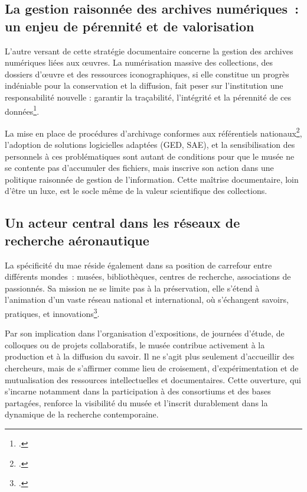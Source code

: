 \subsection{La gestion raisonnée des archives numériques : un enjeu de pérennité et de valorisation}

L’autre versant de cette stratégie documentaire concerne la gestion des archives numériques liées aux œuvres. La numérisation massive des collections, des dossiers d’œuvre et des ressources iconographiques, si elle constitue un progrès indéniable pour la conservation et la diffusion, fait peser sur l’institution une responsabilité nouvelle : garantir la traçabilité, l’intégrité et la pérennité de ces données\footcite{ministeredelacultureDocumenterArchiverMusee2020,bechardArchivesElectroniques2020a}. 

La mise en place de procédures d’archivage conformes aux référentiels nationaux\footcite{comiteinterministerielauxarchivesdefranceReferentielGeneralGestion}, l’adoption de solutions logicielles adaptées (GED, SAE), et la sensibilisation des personnels à ces problématiques sont autant de conditions pour que le musée ne se contente pas d’accumuler des fichiers, mais inscrive son action dans une politique raisonnée de gestion de l’information. Cette maîtrise documentaire, loin d’être un luxe, est le socle même de la valeur scientifique des collections.

\subsection{Un acteur central dans les réseaux de recherche aéronautique}

La spécificité du \ac{mae} réside également dans sa position de carrefour entre différents mondes : musées, bibliothèques, centres de recherche, associations de passionnés. Sa mission ne se limite pas à la préservation, elle s’étend à l’animation d’un vaste réseau national et international, où s’échangent savoirs, pratiques, et innovations\footcite{collectifMuseeLairLespace2023,yarrowBibliothequesPubliquesArchives2008a}. 

Par son implication dans l’organisation d’expositions, de journées d’étude, de colloques ou de projets collaboratifs, le musée contribue activement à la production et à la diffusion du savoir. Il ne s’agit plus seulement d’accueillir des chercheurs, mais de s’affirmer comme lieu de croisement, d’expérimentation et de mutualisation des ressources intellectuelles et documentaires. Cette ouverture, qui s’incarne notamment dans la participation à des consortiums et des bases partagées, renforce la visibilité du musée et l’inscrit durablement dans la dynamique de la recherche contemporaine.

